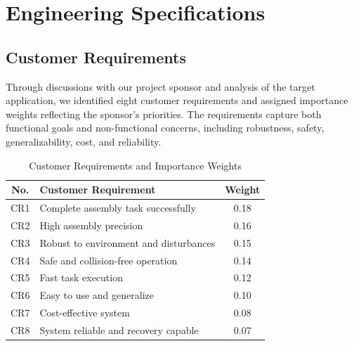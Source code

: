 \documentclass[12pt, letterpaper]{article}
\newcommand{\drone}[1]{{\color{gray}#1}}
\begin{document}
\section{Engineering Specifications}

\subsection{Customer Requirements}

\drone{Through discussions with our project sponsor and analysis of the target application, we identified eight customer requirements and assigned importance weights reflecting the sponsor's priorities. The requirements capture both functional goals and non-functional concerns, including robustness, safety, generalizability, cost, and reliability.}

\begin{table}[H]
\centering
\caption{Customer Requirements and Importance Weights}
\label{tab:cr}
\color{gray}
\begin{tabular}{clc}
\toprule
\textbf{No.} & \textbf{Customer Requirement} & \textbf{Weight} \\
\midrule
CR1 & Complete assembly task successfully & 0.18 \\
CR2 & High assembly precision & 0.16 \\
CR3 & Robust to environment and disturbances & 0.15 \\
CR4 & Safe and collision-free operation & 0.14 \\
CR5 & Fast task execution & 0.12 \\
CR6 & Easy to use and generalize & 0.10 \\
CR7 & Cost-effective system & 0.08 \\
CR8 & System reliable and recovery capable & 0.07 \\
\bottomrule
\end{tabular}
\end{table}
\end{document}
